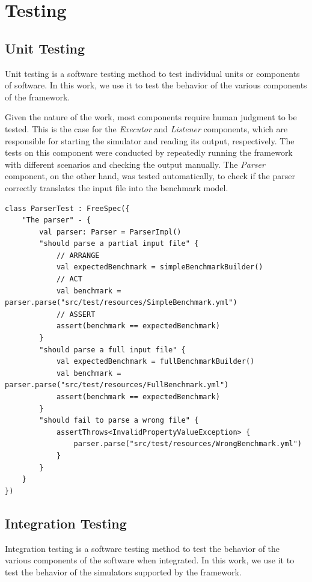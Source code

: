 \documentclass[12pt,a4paper,openright,twoside]{book}
\begin{document}
\section{Testing}

\subsection*{Unit Testing}
Unit testing is a software testing method to test individual units or components of software.
In this work, we use it to test the behavior of the various components of the framework.

Given the nature of the work, most components require human judgment to be tested. 
This is the case for the \emph{Executor} and \emph{Listener} components, which are responsible for starting the simulator and reading its output, respectively.
The tests on this component were conducted by repeatedly running the framework with different scenarios and checking the output manually.
The \emph{Parser} component, on the other hand, was tested automatically, to check if the parser correctly translates the input file into the benchmark model.

\begin{lstlisting}[style=my-kotlin, language=my-kotlin, caption={Parser tests}]
  class ParserTest : FreeSpec({
    "The parser" - {
        val parser: Parser = ParserImpl()
        "should parse a partial input file" {
            // ARRANGE
            val expectedBenchmark = simpleBenchmarkBuilder()
            // ACT
            val benchmark = parser.parse("src/test/resources/SimpleBenchmark.yml")
            // ASSERT
            assert(benchmark == expectedBenchmark)
        }
        "should parse a full input file" {
            val expectedBenchmark = fullBenchmarkBuilder()
            val benchmark = parser.parse("src/test/resources/FullBenchmark.yml")
            assert(benchmark == expectedBenchmark)
        }
        "should fail to parse a wrong file" {
            assertThrows<InvalidPropertyValueException> {
                parser.parse("src/test/resources/WrongBenchmark.yml")
            }
        }
    }
})
\end{lstlisting}

\subsection*{Integration Testing}

Integration testing is a software testing method to test the behavior of the various components of the software when integrated.
In this work, we use it to test the behavior of the simulators supported by the framework.
\end{document}
